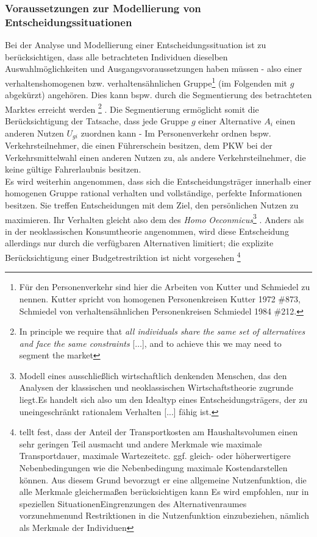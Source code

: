 \subsubsection{Voraussetzungen zur Modellierung von Entscheidungssituationen}
\label{_Toc366766080}
\label{_Toc366775274}
Bei der Analyse und Modellierung einer Entscheidungssituation ist zu berücksichtigen, dass alle betrachteten Individuen dieselben Auswahlmöglichkeiten und Ausgangsvoraussetzungen haben müssen  \autocites[][]{bib.268} - also einer verhaltenshomogenen bzw. verhaltensähnlichen Gruppe\footnote{%
 Für den Personenverkehr sind hier die Arbeiten von Kutter und Schmiedel zu nennen. Kutter spricht von homogenen Personenkreisen {Kutter 1972 \#873}, Schmiedel von verhaltensähnlichen Personenkreisen {Schmiedel 1984 \#212}.
}%
 (im Folgenden mit $g$ abgekürzt) angehören. Dies kann bspw. durch die Segmentierung des betrachteten Marktes erreicht werden  \autocites[][]{bib.268}\footnote{%
 \glqq In principle we require that \emph{all individuals share the same set of alternatives and face the same constraints} [$\ldots$], and to achieve this we may need to segment the market\grqq   \autocites[][]{bib.268}
}%
. Die Segmentierung ermöglicht somit die Berücksichtigung der Tatsache, dass jede Gruppe $g$ einer Alternative ${{A}_{i}}$ einen anderen Nutzen ${{U}_{gi}}$ zuordnen kann  \autocites[][]{bib.103} \autocites[][]{bib.325} - Im Personenverkehr ordnen bspw. Verkehrsteilnehmer, die einen Führerschein besitzen, dem PKW bei der Verkehrsmittelwahl einen anderen Nutzen zu, als andere Verkehrsteilnehmer, die keine gültige Fahrerlaubnis besitzen.~\\
Es wird weiterhin angenommen, dass sich die Entscheidungsträger innerhalb einer homogenen Gruppe rational verhalten und vollständige, perfekte Informationen besitzen. Sie treffen Entscheidungen mit dem Ziel, den persönlichen Nutzen zu maximieren. Ihr Verhalten gleicht also dem des \emph{Homo }\emph{Oeconmicus}\footnote{%
 \glqq Modell eines ausschließlich wirtschaftlich denkenden Menschen, das den Analysen der klassischen und neoklassischen Wirtschaftstheorie zugrunde liegt.\grqq  Es handelt sich also um den \glqq Idealtyp eines Entscheidungsträgers, der zu uneingeschränkt rationalem Verhalten [...] fähig ist.
}%
. Anders als in der neoklassischen Konsumtheorie angenommen, wird diese Entscheidung allerdings nur durch die verfügbaren Alternativen limitiert; die explizite Berücksichtigung einer Budgetrestriktion ist nicht vorgesehen  \autocites[][]{bib.771}\footnote{%
  \citeauthor{bib.771} tellt fest, dass der Anteil der Transportkosten am Haushaltsvolumen einen sehr geringen Teil ausmacht und andere Merkmale wie \glqq maximale Transportdauer\grqq , \glqq maximale Wartezeit\grqq  etc. ggf. gleich- oder höherwertigere Nebenbedingungen wie die Nebenbedingung \glqq maximale Kosten\grqq  darstellen können. Aus diesem Grund bevorzugt er eine allgemeine Nutzenfunktion, die alle Merkmale gleichermaßen berücksichtigen kann  \autocites[][]{bib.771} Es wird empfohlen, nur in \glqq speziellen Situationen\grqq  \glqq Eingrenzungen des Alternativenraumes vorzunehmen\grqq  und \glqq Restriktionen in die Nutzenfunktion einzubeziehen, nämlich als Merkmale der Individuen\grqq   \autocites[][]{bib.593}
}%
